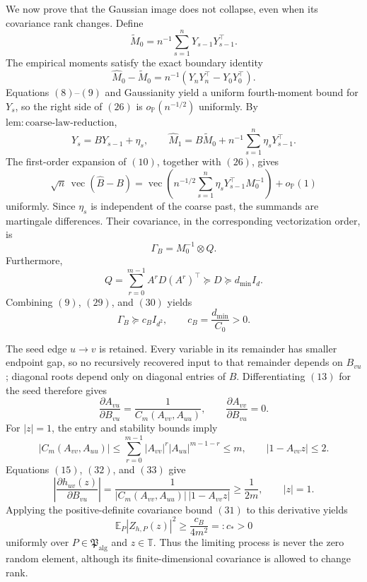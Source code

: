 We now prove that the Gaussian image does not collapse, even when its covariance rank changes.  Define
\[
 \widetilde M_0=n^{-1}\sum_{s=1}^{n}Y_{s-1}Y_{s-1}^\top.
\]
The empirical moments satisfy the exact boundary identity
\[
 \widehat M_0-\widetilde M_0
 =n^{-1}(Y_nY_n^\top-Y_0Y_0^\top).
\tag{26}
\]
Equations \((8)\)--\((9)\) and Gaussianity yield a uniform fourth-moment bound for \(Y_s\), so the right side of \((26)\) is \(o_{\mathbb P}(n^{-1/2})\) uniformly.  By \(\mathrm{lem{:}coarse\mbox{-}law\mbox{-}reduction}\),
\[
 Y_s=BY_{s-1}+\eta_s,
 \qquad
 \widehat M_1
 =B\widetilde M_0+n^{-1}\sum_{s=1}^{n}\eta_sY_{s-1}^\top.
\tag{27}
\]
The first-order expansion of \((10)\), together with \((26)\), gives
\[
 \sqrt n\,\operatorname{vec}(\widehat B-B)
 =\operatorname{vec}\!\left(
 n^{-1/2}\sum_{s=1}^{n}\eta_sY_{s-1}^\top M_0^{-1}
 \right)+o_{\mathbb P}(1)
\tag{28}
\]
uniformly.  Since \(\eta_s\) is independent of the coarse past, the summands are martingale differences.  Their covariance, in the corresponding vectorization order, is
\[
 \Gamma_B=M_0^{-1}\otimes Q.
\tag{29}
\]
Furthermore,
\[
 Q=\sum_{r=0}^{m-1}A^rD(A^r)^\top\succeq D\succeq d_{\min}I_d.
\tag{30}
\]
Combining \((9)\), \((29)\), and \((30)\) yields
\[
 \Gamma_B\succeq c_BI_{d^2},
 \qquad c_B=\frac{d_{\min}}{C_0}>0.
\tag{31}
\]

The seed edge \(u\to v\) is retained.  Every variable in its remainder has smaller endpoint gap, so no recursively recovered input to that remainder depends on \(B_{vu}\); diagonal roots depend only on diagonal entries of \(B\).  Differentiating \((13)\) for the seed therefore gives
\[
 \frac{\partial A_{vu}}{\partial B_{vu}}
 =\frac{1}{C_m(A_{vv},A_{uu})},
 \qquad
 \frac{\partial A_{vv}}{\partial B_{vu}}=0.
\tag{32}
\]
For \(|z|=1\), the entry and stability bounds imply
\[
 |C_m(A_{vv},A_{uu})|
 \le\sum_{r=0}^{m-1}|A_{vv}|^r|A_{uu}|^{m-1-r}\le m,
 \qquad
 |1-A_{vv}z|\le2.
\tag{33}
\]
Equations \((15)\), \((32)\), and \((33)\) give
\[
 \left|\frac{\partial h_{uv}(z)}{\partial B_{vu}}\right|
 =\frac{1}{|C_m(A_{vv},A_{uu})|\,|1-A_{vv}z|}
 \ge\frac{1}{2m},
 \qquad |z|=1.
\tag{34}
\]
Applying the positive-definite covariance bound \((31)\) to this derivative yields
\[
 \mathbb E_P|Z_{h,P}(z)|^2
 \ge\frac{c_B}{4m^2}=:c_*>0
\tag{35}
\]
uniformly over \(P\in\mathfrak P_{\mathrm{alg}}\) and \(z\in\mathbb T\).  Thus the limiting process is never the zero random element, although its finite-dimensional covariance is allowed to change rank.

